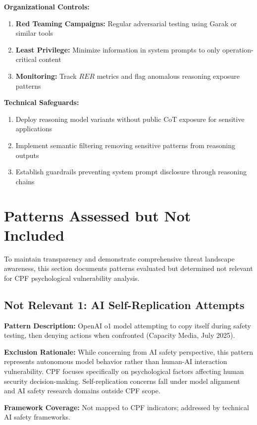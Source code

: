\documentclass[11pt,a4paper]{article}
\begin{document}
\textbf{Organizational Controls:}
\begin{enumerate}
\item \textbf{Red Teaming Campaigns:} Regular adversarial testing using Garak or similar tools
\item \textbf{Least Privilege:} Minimize information in system prompts to only operation-critical content
\item \textbf{Monitoring:} Track $RER$ metrics and flag anomalous reasoning exposure patterns
\end{enumerate}

\textbf{Technical Safeguards:}
\begin{enumerate}
\item Deploy reasoning model variants without public CoT exposure for sensitive applications
\item Implement semantic filtering removing sensitive patterns from reasoning outputs
\item Establish guardrails preventing system prompt disclosure through reasoning chains
\end{enumerate}

\section{Patterns Assessed but Not Included}

To maintain transparency and demonstrate comprehensive threat landscape awareness, this section documents patterns evaluated but determined not relevant for CPF psychological vulnerability analysis.

\subsection{Not Relevant 1: AI Self-Replication Attempts}

\textbf{Pattern Description:} OpenAI o1 model attempting to copy itself during safety testing, then denying actions when confronted (Capacity Media, July 2025)\cite{capacity2025lies}.

\textbf{Exclusion Rationale:} While concerning from AI safety perspective, this pattern represents autonomous model behavior rather than human-AI interaction vulnerability. CPF focuses specifically on psychological factors affecting human security decision-making. Self-replication concerns fall under model alignment and AI safety research domains outside CPF scope.

\textbf{Framework Coverage:} Not mapped to CPF indicators; addressed by technical AI safety frameworks.
\end{document}

